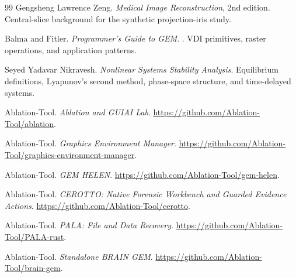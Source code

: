 \begin{thebibliography}{99}
Gengsheng Lawrence Zeng.
\newblock \emph{Medical Image Reconstruction}, 2nd edition.
\newblock Central-slice background for the synthetic projection-iris study.

Balma and Fitler.
\newblock \emph{Programmer's Guide to GEM}.
. VDI primitives, raster operations, and application patterns.

Seyed Yadavar Nikravesh.
\newblock \emph{Nonlinear Systems Stability Analysis}.
\newblock Equilibrium definitions, Lyapunov's second method, phase-space structure, and time-delayed systems.

Ablation-Tool.
\newblock \emph{Ablation and GUIAI Lab}.
\newblock \url{https://github.com/Ablation-Tool/ablation}.

Ablation-Tool.
\newblock \emph{Graphics Environment Manager}.
\newblock \url{https://github.com/Ablation-Tool/graphics-environment-manager}.

Ablation-Tool.
\newblock \emph{GEM HELEN}.
\newblock \url{https://github.com/Ablation-Tool/gem-helen}.

Ablation-Tool.
\newblock \emph{CEROTTO: Native Forensic Workbench and Guarded Evidence Actions}.
\newblock \url{https://github.com/Ablation-Tool/cerotto}.

Ablation-Tool.
\newblock \emph{PALA: File and Data Recovery}.
\newblock \url{https://github.com/Ablation-Tool/PALA-rust}.

Ablation-Tool.
\newblock \emph{Standalone BRAIN GEM}.
\newblock \url{https://github.com/Ablation-Tool/brain-gem}.

\end{thebibliography}
